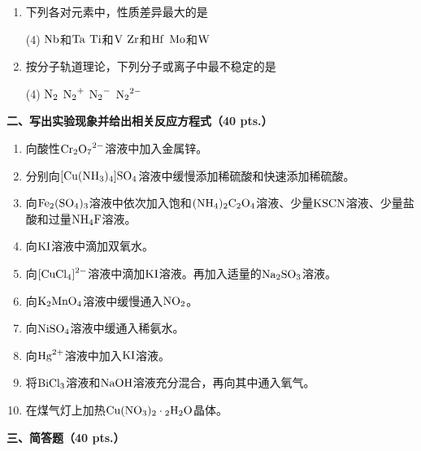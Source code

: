 \begin{enumerate}[label=\arabic*., itemsep=1.5ex]
\begin{tasks}
        \task $\ce{Na2SO4}$
        \task $\ce{K2S2O8}$
        \task $\ce{Na2O2}$
    \end{tasks}
    \item 下列各对元素中，性质差异最大的是
    \begin{tasks}(4)
        \task $\ce{Nb}$和$\ce{Ta}$
        \task $\ce{Ti}$和$\ce{V}$
        \task $\ce{Zr}$和$\ce{Hf}$
        \task $\ce{Mo}$和$\ce{W}$
    \end{tasks}
    \item 按分子轨道理论，下列分子或离子中最不稳定的是
    \begin{tasks}(4)
        \task $\ce{N2}$
        \task $\ce{N2^+}$
        \task $\ce{N2^-}$
        \task $\ce{N2^2-}$
    \end{tasks}
\end{enumerate}

\vspace{0.5cm}
\noindent\textbf{二、写出实验现象并给出相关反应方程式（40 pts.）}

\begin{enumerate}[label=\arabic*., start=1, itemsep=1.5ex]
    \item 向酸性$\ce{Cr2O7^2-}$溶液中加入金属锌。
    \item 分别向$\ce{[Cu(NH3)4]SO4}$溶液中缓慢添加稀硫酸和快速添加稀硫酸。
    \item 向$\ce{Fe2(SO4)3}$溶液中依次加入饱和$\ce{(NH4)2C2O4}$溶液、少量$\ce{KSCN}$溶液、少量盐酸和过量$\ce{NH4F}$溶液。
    \item 向$\ce{KI}$溶液中滴加双氧水。
    \item 向$\ce{[CuCl4]^2-}$溶液中滴加$\ce{KI}$溶液。再加入适量的$\ce{Na2SO3}$溶液。
    \item 向$\ce{K2MnO4}$溶液中缓慢通入$\ce{NO2}$。
    \item 向$\ce{NiSO4}$溶液中缓通入稀氨水。
    \item 向$\ce{Hg^{2+}}$溶液中加入$\ce{KI}$溶液。
    \item 将$\ce{BiCl3}$溶液和$\ce{NaOH}$溶液充分混合，再向其中通入氧气。
    \item 在煤气灯上加热$\ce{Cu(NO3)2\cdot 2H2O}$晶体。
\end{enumerate}

\vspace{0.5cm}
\noindent\textbf{三、简答题（40 pts.）}

